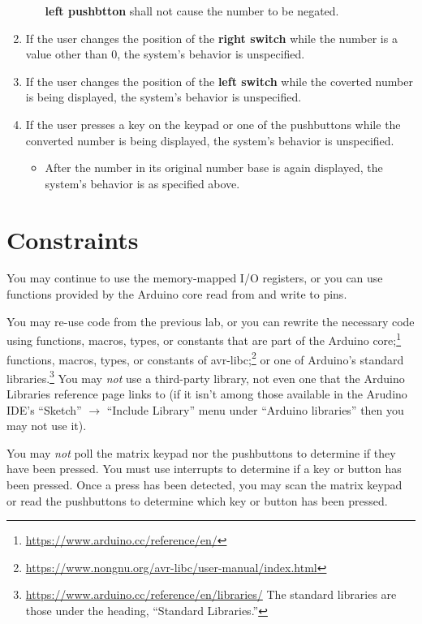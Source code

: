 \begin{enumerate}
\begin{enumerate}
        \textbf{left pushbtton} shall not cause the number to be negated.
    \end{enumerate}
\item If the user changes the position of the \textbf{right switch} while the
    number is a value other than 0, the system's behavior is unspecified.
\item If the user changes the position of the \textbf{left switch} while the
    coverted number is being displayed, the system's behavior is unspecified.
\item If the user presses a key on the keypad or one of the pushbuttons while
    the converted number is being displayed, the system's behavior is
    unspecified.
    \begin{itemize}
    \item After the number in its original number base is again displayed, the
    system's behavior is as specified above.
    \end{itemize}
\end{enumerate}

\section{Constraints}\label{sec:Constraints}

You may continue to use the memory-mapped I/O registers, or you can use
functions provided by the Arduino core read from and write to pins.

You may re-use code from the previous lab, or you can rewrite the necessary
code using functions, macros, types, or constants that are part of the Arduino
core;\footnote{\url{https://www.arduino.cc/reference/en/}} functions, macros,
types, or constants of
avr-libc;\footnote{\url{https://www.nongnu.org/avr-libc/user-manual/index.html}}
or one of Arduino's standard
libraries.\footnote{\url{https://www.arduino.cc/reference/en/libraries/} The
standard libraries are those under the heading, ``Standard Libraries.''} You
may \textit{not} use a third-party library, not even one that the Arduino
Libraries reference page links to (if it isn't among those available in the
Arudino IDE's ``Sketch'' $\rightarrow$ ``Include Library'' menu under
``Arduino libraries'' then you may not use it).

You may \textit{not} poll the matrix keypad nor the pushbuttons to determine
if they have been pressed. You must use interrupts to determine if a key or
button has been pressed. Once a press has been detected, you may scan the
matrix keypad or read the pushbuttons to determine which key or button has
been pressed.

